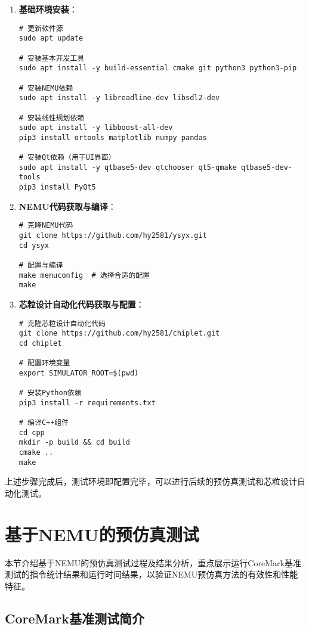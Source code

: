 \documentclass[bachelor]{thesis-uestc}
\begin{document}
\begin{enumerate}
    \item \textbf{基础环境安装}：
    
    \begin{verbatim}
# 更新软件源
sudo apt update

# 安装基本开发工具
sudo apt install -y build-essential cmake git python3 python3-pip

# 安装NEMU依赖
sudo apt install -y libreadline-dev libsdl2-dev

# 安装线性规划依赖
sudo apt install -y libboost-all-dev
pip3 install ortools matplotlib numpy pandas

# 安装Qt依赖（用于UI界面）
sudo apt install -y qtbase5-dev qtchooser qt5-qmake qtbase5-dev-tools
pip3 install PyQt5
    \end{verbatim}

    \item \textbf{NEMU代码获取与编译}：
    
    \begin{verbatim}
# 克隆NEMU代码
git clone https://github.com/hy2581/ysyx.git
cd ysyx

# 配置与编译
make menuconfig  # 选择合适的配置
make
    \end{verbatim}

    \item \textbf{芯粒设计自动化代码获取与配置}：
    
    \begin{verbatim}
# 克隆芯粒设计自动化代码
git clone https://github.com/hy2581/chiplet.git
cd chiplet

# 配置环境变量
export SIMULATOR_ROOT=$(pwd)

# 安装Python依赖
pip3 install -r requirements.txt

# 编译C++组件
cd cpp
mkdir -p build && cd build
cmake ..
make
    \end{verbatim}
\end{enumerate}

上述步骤完成后，测试环境即配置完毕，可以进行后续的预仿真测试和芯粒设计自动化测试。

\section{基于NEMU的预仿真测试}

本节介绍基于NEMU的预仿真测试过程及结果分析，重点展示运行CoreMark基准测试的指令统计结果和运行时间结果，以验证NEMU预仿真方法的有效性和性能特征。

\subsection{CoreMark基准测试简介}
\end{document}
